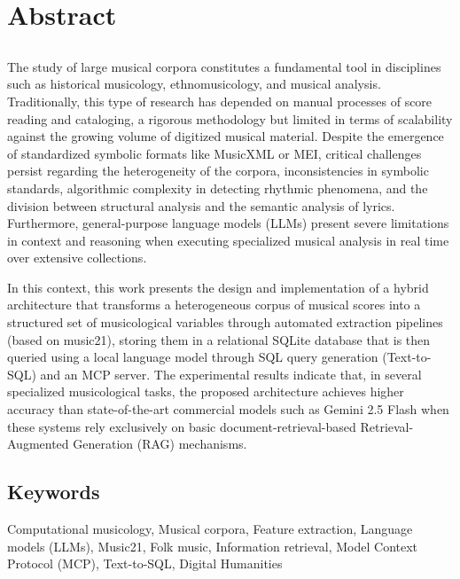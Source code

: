 \chapter*{Abstract}

\section*{\tituloPortadaEngVal}

The study of large musical corpora constitutes a fundamental tool in disciplines such as historical musicology, ethnomusicology, and musical analysis. Traditionally, this type of research has depended on manual processes of score reading and cataloging, a rigorous methodology but limited in terms of scalability against the growing volume of digitized musical material. Despite the emergence of standardized symbolic formats like MusicXML or MEI, critical challenges persist regarding the heterogeneity of the corpora, inconsistencies in symbolic standards, algorithmic complexity in detecting rhythmic phenomena, and the division between structural analysis and the semantic analysis of lyrics. Furthermore, general-purpose language models (LLMs) present severe limitations in context and reasoning when executing specialized musical analysis in real time over extensive collections.

In this context, this work presents the design and implementation of a hybrid architecture that transforms a heterogeneous corpus of musical scores into a structured set of musicological variables through automated extraction pipelines (based on music21), storing them in a relational SQLite database that is then queried using a local language model through SQL query generation (Text-to-SQL) and an MCP server. The experimental results indicate that, in several specialized musicological tasks, the proposed architecture achieves higher accuracy than state-of-the-art commercial models such as Gemini 2.5 Flash when these systems rely exclusively on basic document-retrieval-based Retrieval-Augmented Generation (RAG) mechanisms.

\section*{Keywords}

\noindent Computational musicology, Musical corpora, Feature extraction, Language models (LLMs), Music21, Folk music, Information retrieval, Model Context Protocol (MCP), Text-to-SQL, Digital Humanities
